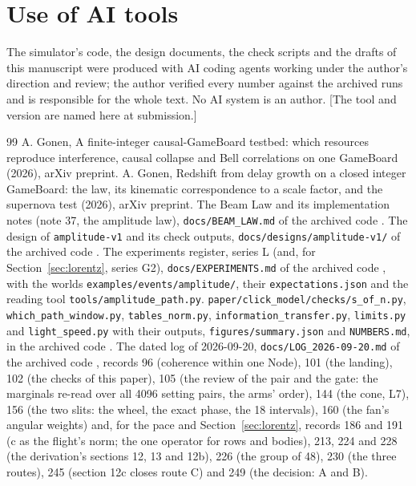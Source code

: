 \documentclass[11pt]{article}
\theoremstyle{definition}
\begin{document}
\section*{Use of AI tools}
The simulator's code, the design documents, the check scripts and the
drafts of this manuscript were produced with AI coding agents working
under the author's direction and review; the author verified every
number against the archived runs and is responsible for the whole text.
No AI system is an author. [The tool and version are named here at
submission.]

\begin{thebibliography}{99}
 A. Gonen, A finite-integer causal-GameBoard testbed: which resources reproduce interference, causal collapse and Bell correlations on one GameBoard (2026), arXiv preprint.
 A. Gonen, Redshift from delay growth on a closed integer GameBoard: the law, its kinematic correspondence to a scale factor, and the supernova test (2026), arXiv preprint.
 The Beam Law and its implementation notes (note 37, the amplitude law), \texttt{docs/BEAM\_LAW.md} of the archived code \cite{zenodo}.
 The design of \texttt{amplitude-v1} and its check outputs, \texttt{docs/designs/amplitude-v1/} of the archived code \cite{zenodo}.
 The experiments register, series L (and, for Section~\ref{sec:lorentz}, series G2), \texttt{docs/EXPERIMENTS.md} of the archived code \cite{zenodo}, with the worlds \texttt{examples/events/amplitude/}, their \texttt{expectations.json} and the reading tool \texttt{tools/amplitude\_path.py}.
 \texttt{paper/click\_model/checks/s\_of\_n.py}, \texttt{which\_path\_window.py}, \texttt{tables\_norm.py}, \texttt{information\_transfer.py}, \texttt{limits.py} and \texttt{light\_speed.py} with their outputs, \texttt{figures/summary.json} and \texttt{NUMBERS.md}, in the archived code \cite{zenodo}.
 The dated log of 2026-09-20, \texttt{docs/LOG\_2026-09-20.md} of the archived code \cite{zenodo}, records 96 (coherence within one Node), 101 (the landing), 102 (the checks of this paper), 105 (the review of the pair and the gate: the marginals re-read over all 4096 setting pairs, the arms' order), 144 (the cone, L7), 156 (the two slits: the wheel, the exact phase, the 18 intervals), 160 (the fan's angular weights) and, for the pace and Section~\ref{sec:lorentz}, records 186 and 191 (c as the flight's norm; the one operator for rows and bodies), 213, 224 and 228 (the derivation's sections 12, 13 and 12b), 226 (the group of 48), 230 (the three routes), 245 (section 12c closes route C) and 249 (the decision: A and B).

\end{thebibliography}
\end{document}
